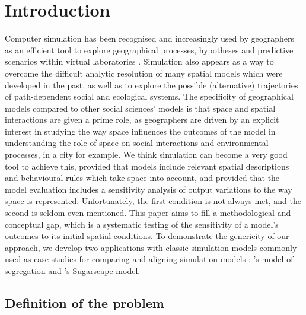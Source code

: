 \documentclass[3p,times,procedia]{elsarticle}
\begin{document}

\enlargethispage{-15mm}







\section{Introduction}

Computer simulation has been recognised and increasingly used by geographers as an efficient tool to explore geographical processes, hypotheses and predictive scenarios within virtual laboratories \citep{batty1971modelling, batty2007model, carley1999generating, Quesneletal2009}. Simulation also appears as a way to overcome the difficult analytic resolution of many spatial models which were developed in the past, as well as to explore the possible (alternative) trajectories of path-dependent social and ecological systems. The specificity of geographical models compared to other social sciences' models is that space and spatial interactions are given a prime role, as geographers are driven by an explicit interest in studying the way space influences the outcomes of the model in understanding the role of space on social interactions and environmental processes, in a city for example. We think simulation can become a very good tool to achieve this, provided that models include relevant spatial descriptions and behavioural rules which take space into account, and provided that the model evaluation includes a sensitivity analysis of output variations to the way space is represented. Unfortunately, the first condition is not always met, and the second is seldom even mentioned. This paper aims to fill a methodological and conceptual gap, which is a systematic testing of the sensitivity of a model's outcomes to its initial spatial conditions. To demonstrate the genericity of our approach, we develop two applications with classic simulation models commonly used as case studies for comparing and aligning simulation models \citep{Axtelletal1996, wilensky2007making}: \citet{schelling1971dynamic}'s model of segregation and \citet{EpsteinAxtell1996}'s Sugarscape model.\\

\subsection{Definition of the problem}
\end{document}
